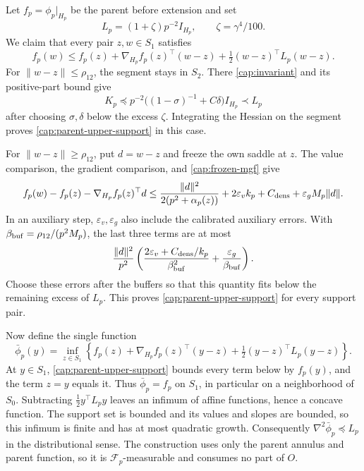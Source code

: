 Let \(f_p=\phi_p|_{H_p}\) be the parent before extension and set
\[
 L_p=(1+\zeta)p^{-2}I_{H_p},\qquad \zeta=\gamma^4/100.
\]
We claim that every pair \(z,w\in S_1\) satisfies
\begin{equation}\label{cap:parent-upper-support}
 f_p(w)\le f_p(z)+\nabla_{H_p}f_p(z)^\top(w-z)
                  +\tfrac12(w-z)^\top L_p(w-z).
\end{equation}
For \(\|w-z\|\le\rho_{12}\), the segment stays in \(S_2\). There
\eqref{cap:invariant} and its positive-part bound give
\[
 K_p\preceq p^{-2}\bigl((1-\sigma)^{-1}+C\delta\bigr)I_{H_p}
 \prec L_p
\]
after choosing \(\sigma,\delta\) below the excess \(\zeta\). Integrating the
Hessian on the segment proves \eqref{cap:parent-upper-support} in this case.

For \(\|w-z\|\ge\rho_{12}\), put \(d=w-z\) and freeze the own saddle at
\(z\). The value comparison, the gradient comparison, and
\eqref{cap:frozen-mgf} give
\[
 f_p(w)-f_p(z)-\nabla_{H_p}f_p(z)^\top d
 \le \frac{\|d\|^2}{2(p^2+\alpha_p(z))}
       +2\varepsilon_v k_p+C_{\rm dens}
       +\varepsilon_g M_p\|d\|.
\]
In an auxiliary step, \(\varepsilon_v,\varepsilon_g\) also include the
calibrated auxiliary errors. With
\(\beta_{\rm buf}=\rho_{12}/(p^2M_p)\), the last three terms are at most
\[
 \frac{\|d\|^2}{p^2}
 \left(\frac{2\varepsilon_v+C_{\rm dens}/k_p}{\beta_{\rm buf}^2}
       +\frac{\varepsilon_g}{\beta_{\rm buf}}\right).
\]
Choose these errors after the buffers so that this quantity fits below the
remaining excess of \(L_p\). This proves
\eqref{cap:parent-upper-support} for every support pair.

Now define the single function
\begin{equation}\label{cap:parent-extension}
 \bar\phi_p(y)=\inf_{z\in S_1}
 \left\{f_p(z)+\nabla_{H_p}f_p(z)^\top(y-z)
                   +\tfrac12(y-z)^\top L_p(y-z)\right\}.
\end{equation}
At \(y\in S_1\), \eqref{cap:parent-upper-support} bounds every term below
by \(f_p(y)\), and the term \(z=y\) equals it. Thus \(\bar\phi_p=f_p\)
on \(S_1\), in particular on a neighborhood of \(S_0\). Subtracting
\(\tfrac12y^\top L_py\) leaves an infimum of affine functions, hence a
concave function. The support set is bounded and its values and slopes are
bounded, so this infimum is finite and has at most quadratic growth.
Consequently \(\nabla^2\bar\phi_p\preceq L_p\) in the distributional sense.
The construction uses only the parent annulus and parent function, so it is
\(\mathscr F_p\)-measurable and consumes no part of \(O\).

